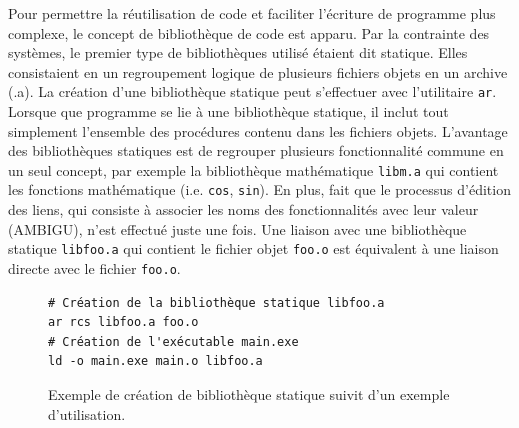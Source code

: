 %
%

Pour permettre la réutilisation de code et faciliter
l'écriture de programme plus complexe, le concept de bibliothèque de code est
apparu. Par la contrainte des systèmes, le premier type de bibliothèques utilisé
étaient dit statique.  Elles consistaient en un regroupement logique de
plusieurs fichiers objets en un archive (.a). La création d'une bibliothèque
statique peut s'effectuer avec l'utilitaire \verb|ar|. Lorsque que programme se
lie à une bibliothèque statique, il inclut tout simplement l'ensemble des
procédures contenu dans les fichiers objets. L'avantage des bibliothèques
statiques est de regrouper plusieurs fonctionnalité commune en un seul concept,
par exemple la bibliothèque mathématique \verb|libm.a| qui contient les
fonctions mathématique (i.e. \verb|cos|, \verb|sin|).  En plus,  fait que le
processus d'édition des liens, qui consiste à associer les noms des
fonctionnalités avec leur valeur (AMBIGU), n'est effectué juste une fois. Une
liaison avec une bibliothèque statique \verb|libfoo.a| qui contient le fichier
objet \verb|foo.o| est équivalent à une liaison directe avec le fichier
\verb|foo.o|.

\begin{figure}[ht]
    \begin{minipage}[t]{0.5\textwidth}
\begin{verbatim}
# Création de la bibliothèque statique libfoo.a
ar rcs libfoo.a foo.o
# Création de l'exécutable main.exe
ld -o main.exe main.o libfoo.a
\end{verbatim}
    \end{minipage}

    \caption{Exemple de création de bibliothèque statique suivit d'un exemple
    d'utilisation.}
\end{figure}

